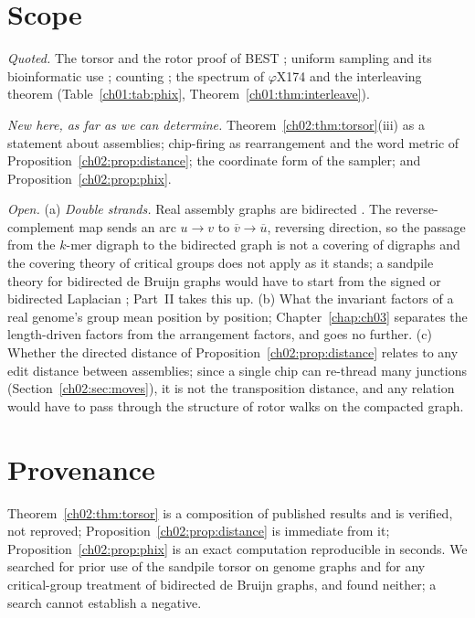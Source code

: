 \section{Scope}\label{ch02:sec:scope}

\emph{Quoted.} The torsor and the rotor proof of BEST \cite{HLMPPW}; uniform sampling
\cite{CMN,PW,Wilson,CC} and its bioinformatic use \cite{AE,KMUW,uShuffle}; counting
\cite{ABCS,KSP}; the spectrum of $\varphi$X174 and the interleaving theorem (Table~\ref{ch01:tab:phix},
Theorem~\ref{ch01:thm:interleave}).

\emph{New here, as far as we can determine.} Theorem~\ref{ch02:thm:torsor}(iii) as a statement
about assemblies; chip-firing as rearrangement and the word metric of
Proposition~\ref{ch02:prop:distance}; the coordinate form of the sampler; and
Proposition~\ref{ch02:prop:phix}.

\emph{Open.} (a) \emph{Double strands.} Real assembly graphs are bidirected
\cite{KM,MB}. The reverse-complement map sends an arc $u\to v$ to $\overline v\to\overline u$,
reversing direction, so the passage from the $k$-mer digraph to the bidirected graph is not
a covering of digraphs and the covering theory of critical groups \cite{RT14} does not apply
as it stands; a sandpile theory for bidirected de Bruijn graphs would have to start from
the signed or bidirected Laplacian \cite{Zas82}; Part~II takes this up. (b) What the
invariant factors of a real genome's group mean position by position; Chapter~\ref{chap:ch03}
separates the length-driven factors from the arrangement factors, and goes no further. (c) Whether the directed distance of
Proposition~\ref{ch02:prop:distance} relates to any edit distance between assemblies; since a
single chip can re-thread many junctions (Section~\ref{ch02:sec:moves}), it is not the
transposition distance, and any relation would have to pass through the structure of
rotor walks on the compacted graph.

\section*{Provenance}

Theorem~\ref{ch02:thm:torsor} is a composition of published results and is
verified, not reproved; Proposition~\ref{ch02:prop:distance} is immediate from it;
Proposition~\ref{ch02:prop:phix} is an exact computation reproducible in seconds. We searched
for prior use of the sandpile torsor on genome graphs and for any critical-group treatment
of bidirected de Bruijn graphs, and found neither; a search cannot establish a negative.
